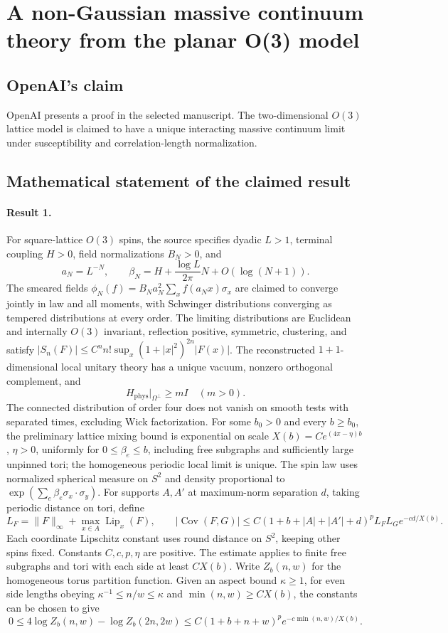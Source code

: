 \documentclass[11pt]{article}
\begin{document}
\section*{A non-Gaussian massive continuum theory from the planar O(3) model}

\subsection{OpenAI's claim}
OpenAI presents a proof in the selected manuscript. The two-dimensional $O(3)$ lattice model is claimed to have a unique interacting massive continuum limit under susceptibility and correlation-length normalization.

\subsection{Mathematical statement of the claimed result}
\paragraph{Result 1.} For square-lattice \(O(3)\) spins, the source specifies dyadic \(L>1\), terminal coupling \(H>0\), field normalizations \(B_N>0\), and
\[
 a_N=L^{-N},\qquad\beta_N=H+\frac{\log L}{2\pi}N+O(\log(N+1)).
\]
The smeared fields \(\phi_N(f)=B_Na_N^2\sum_x f(a_Nx)\sigma_x\) are claimed to converge jointly in law and all moments, with Schwinger distributions converging as tempered distributions at every order. The limiting distributions are Euclidean and internally \(O(3)\) invariant, reflection positive, symmetric, clustering, and satisfy \(|S_n(F)|\le C^nn!\sup_x(1+|x|^2)^{2n}|F(x)|\). The reconstructed \(1+1\)-dimensional local unitary theory has a unique vacuum, nonzero orthogonal complement, and
\[
 H_{\mathrm{phys}}|_{\Omega^\perp}\ge mI\quad(m>0).
\]
The connected distribution of order four does not vanish on smooth tests with separated times, excluding Wick factorization. For some $b_0>0$ and every $b\ge b_0$, the preliminary lattice mixing bound is exponential on scale \(X(b)=Ce^{(4\pi-\eta)b}\), \(\eta>0\), uniformly for \(0\le\beta_e\le b\), including free subgraphs and sufficiently large unpinned tori; the homogeneous periodic local limit is unique. The spin law uses normalized spherical measure on $S^2$ and density proportional to $\exp(\sum_e\beta_e\sigma_x\cdot\sigma_y)$. For supports $A,A'$ at maximum-norm separation $d$, taking periodic distance on tori, define
\[
 L_F=\|F\|_\infty+\max_{x\in A}\operatorname{Lip}_x(F),\qquad
 |\operatorname{Cov}(F,G)|\le C(1+b+|A|+|A'|+d)^p L_FL_G e^{-cd/X(b)}.
\]
Each coordinate Lipschitz constant uses round distance on $S^2$, keeping other spins fixed. Constants $C,c,p,\eta$ are positive. The estimate applies to finite free subgraphs and tori with each side at least $CX(b)$. Write $Z_b(n,w)$ for the homogeneous torus partition function. Given an aspect bound $\kappa\ge1$, for even side lengths obeying $\kappa^{-1}\le n/w\le\kappa$ and $\min(n,w)\ge CX(b)$, the constants can be chosen to give
\[
 0\le4\log Z_b(n,w)-\log Z_b(2n,2w)\le C(1+b+n+w)^p e^{-c\min(n,w)/X(b)}.
\]
\end{document}
